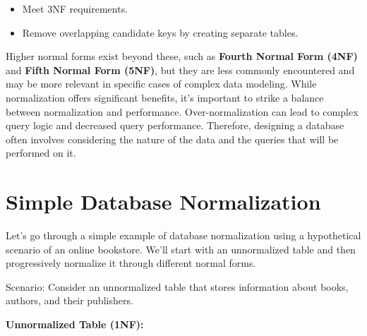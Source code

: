 \documentclass[
]{book}
\providecommand{\tightlist}{%
  \setlength{\itemsep}{0pt}\setlength{\parskip}{0pt}}
\begin{document}
\begin{itemize}
\tightlist
\item
  Meet 3NF requirements.
\item
  Remove overlapping candidate keys by creating separate tables.
\end{itemize}

Higher normal forms exist beyond these, such as \textbf{Fourth Normal Form (4NF)} and \textbf{Fifth Normal Form (5NF)}, but they are less commonly encountered and may be more relevant in specific cases of complex data modeling. While normalization offers significant benefits, it's important to strike a balance between normalization and performance. Over-normalization can lead to complex query logic and decreased query performance. Therefore, designing a database often involves considering the nature of the data and the queries that will be performed on it.

\hypertarget{simple-database-normalization}{%
\section{Simple Database Normalization}\label{simple-database-normalization}}

Let's go through a simple example of database normalization using a hypothetical scenario of an online bookstore. We'll start with an unnormalized table and then progressively normalize it through different normal forms.

Scenario: Consider an unnormalized table that stores information about books, authors, and their publishers.

\textbf{Unnormalized Table (1NF):}
\end{document}
